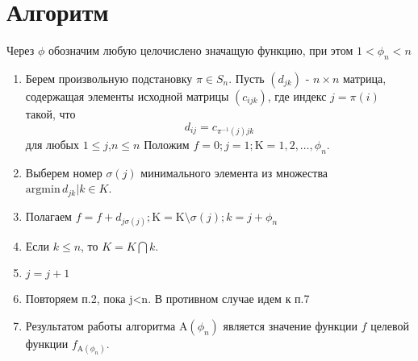 \documentclass[14pt,a4paper]{article}
\begin{document}
\section{Алгоритм}
Через $\phi$ обозначим любую целочислено значащую функцию, при этом $1 < \phi_n < n$ 
\begin{enumerate}
\item Берем произвольную подстановку $\pi \in S_n$. Пусть $(d_{jk})$ - $n \times n$ 
матрица, содержащая элементы исходной матрицы $(c_{ijk})$, где индекс $j=\pi(i)$ такой, что
$$
d_{ij} = c_{\pi^{-1}(j)jk}
$$
для любых $1 \leq j$,$n \leq n$
Положим $f = 0 ; j =1 ; \mathrm{K}={1,2, \ldots , \phi_n}$. 
\item Выберем номер $\sigma(j)$ минимального элемента из множества $\mathrm{argmin} \, {d_{jk} | k \in K}$.
\item Полагаем $f = f + d_{j \sigma (j)} ; \mathrm{K} = \mathrm{K}  \setminus  {\sigma(j)} ; k=j+\phi_n$
\item Если $k \leq n $, то $K = K \bigcap {k}$.
\item $j = j + 1$
\item Повторяем п.2, пока j<n. В противном случае идем к п.7
\item Результатом работы алгоритма $\mathrm{A}(\phi_n)$ является значение функции $f$ целевой функции   
$f_{\mathrm{A}(\phi_n)}$. 
\end{enumerate}
\end{document}
